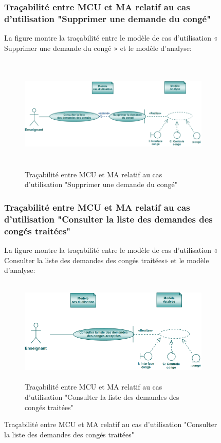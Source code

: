 \documentclass[12 pt]{report}
\begin{document}
\begin{figure}[h]
\begin{center}
\subsubsection{Traçabilité entre MCU et MA relatif au cas d’utilisation "Supprimer une demande du congé" }
La figure  montre la traçabilité entre le modèle de cas d’utilisation « Supprimer une demande du congé » et le modèle d’analyse:

\begin{figure}[h]
\begin{center}
\includegraphics[width= 14cm , height =5.5cm]{tsc.PNG}
\caption{Traçabilité entre MCU et MA relatif au cas d’utilisation "Supprimer une demande du congé"}
\end{center}
\end{figure} 
\subsubsection{Traçabilité entre MCU et MA relatif au cas d’utilisation "Consulter la liste des demandes des congés traitées" }
La figure  montre la traçabilité entre le modèle de cas d’utilisation « Consulter la liste des demandes des congés traitées» et le modèle d’analyse:

\begin{figure}[h]
\begin{center}
\includegraphics[width= 14cm , height =5cm]{tccr.png}
\caption{Traçabilité entre MCU et MA relatif au cas d’utilisation "Consulter la liste des demandes des congés traitées"}
\end{center}
\end{figure}

\end{center}
\end{figure}
\end{document}
